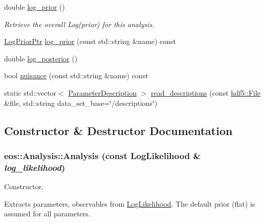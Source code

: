 \begin{DoxyCompactItemize}
double \hyperlink{classeos_1_1Analysis_a521333679365bc779d1136701d31e35d}{log\_\-prior} ()
\begin{DoxyCompactList}\small\item\em Retrieve the overall Log(prior) for this analysis. \item\end{DoxyCompactList}\item 
\hyperlink{namespaceeos_ac5481e3b46ee55ff24606ee7f6e78651}{LogPriorPtr} \hyperlink{classeos_1_1Analysis_ad6647f4d8a1937db18cbce2d33170c55}{log\_\-prior} (const std::string \&name) const 
\item 
double \hyperlink{classeos_1_1Analysis_a8919114802de94afc42068d87346a525}{log\_\-posterior} ()
\item 
bool \hyperlink{classeos_1_1Analysis_a52ed491bbea6d966ea4f8a746b9e980d}{nuisance} (const std::string \&name) const 
\item 
static std::vector$<$ \hyperlink{structeos_1_1ParameterDescription}{ParameterDescription} $>$ \hyperlink{classeos_1_1Analysis_a7f5c6fb49fafda45b0451172b44bf01c}{read\_\-descriptions} (const \hyperlink{classeos_1_1hdf5_1_1File}{hdf5::File} \&file, std::string data\_\-set\_\-base=\char`\"{}/descriptions\char`\"{})
\end{DoxyCompactItemize}


\subsection{Constructor \& Destructor Documentation}
\hypertarget{classeos_1_1Analysis_a252a0ae93caf7c7f6db627fe563c72bc}{
\subsubsection[{Analysis}]{\setlength{\rightskip}{0pt plus 5cm}eos::Analysis::Analysis (const {\bf LogLikelihood} \& {\em log\_\-likelihood})}}
\label{classeos_1_1Analysis_a252a0ae93caf7c7f6db627fe563c72bc}
Constructor.

Extracts parameters, observables from \hyperlink{classeos_1_1LogLikelihood}{LogLikelihood}. The default prior (flat) is assumed for all parameters.



